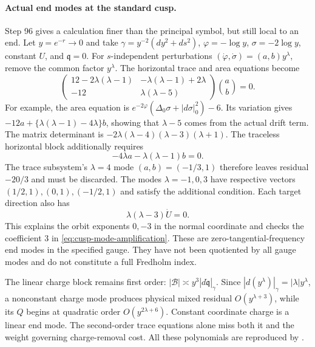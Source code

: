 \documentclass[a4paper,11pt]{article}
\numberwithin{equation}{section}
\theoremstyle{definition}
\begin{document}
\paragraph{Actual end modes at the standard cusp.}
Step 96 gives a calculation finer than the principal symbol, but still local to an end.
Let $y=e^{-r}\to0$ and take
$\gamma=y^{-2}(dy^2+ds^2)$, $\varphi=-\log y$,
$\sigma=-2\log y$, constant $U$, and $\mathfrak q=0$.
For $s$-independent perturbations $(\dot\varphi,\dot\sigma)=(a,b)y^\lambda$, remove the common factor $y^\lambda$.
The horizontal trace and area equations become
\begin{equation}\label{eq:cusp-scalar-indicial}
 \begin{pmatrix}
 12-2\lambda(\lambda-1)&-\lambda(\lambda-1)+2\lambda\\
 -12&\lambda(\lambda-5)
 \end{pmatrix}\binom ab=0.
\end{equation}
For example, the area equation is
$e^{-2\varphi}(\Delta_0\sigma+|d\sigma|_0^2)-6$.
Its variation gives $-12a+\{\lambda(\lambda-1)-4\lambda\}b$, showing that $\lambda-5$ comes from the actual drift term.
The matrix determinant is $-2\lambda(\lambda-4)(\lambda-3)(\lambda+1)$.
The traceless horizontal block additionally requires
\[
 -4\lambda a-\lambda(\lambda-1)b=0.
\]
The trace subsystem's $\lambda=4$ mode $(a,b)=(-1/3,1)$ therefore leaves residual $-20/3$ and must be discarded.
The modes $\lambda=-1,0,3$ have respective vectors
$(1/2,1),(0,1),(-1/2,1)$ and satisfy the additional condition.
Each target direction also has
\begin{equation}\label{eq:cusp-orbit-indicial}
 \lambda(\lambda-3)\dot U=0.
\end{equation}
This explains the orbit exponents $0,-3$ in the normal coordinate and checks the coefficient $3$ in \eqref{eq:cusp-mode-amplification}.
These are zero-tangential-frequency end modes in the specified gauge.
They have not been quotiented by all gauge modes and do not constitute a full Fredholm index.

The linear charge block remains first order:
$|\mathscr B|\asymp y^3|d\dot{\mathfrak q}|_\gamma$.
Since $|d(y^\lambda)|_\gamma=|\lambda|y^\lambda$, a nonconstant charge mode produces physical mixed residual $O(y^{\lambda+3})$, while its $Q$ begins at quadratic order $O(y^{2\lambda+6})$.
Constant coordinate charge is a linear end mode.
The second-order trace equations alone miss both it and the weight governing charge-removal cost.
All these polynomials are reproduced by .
\end{document}

